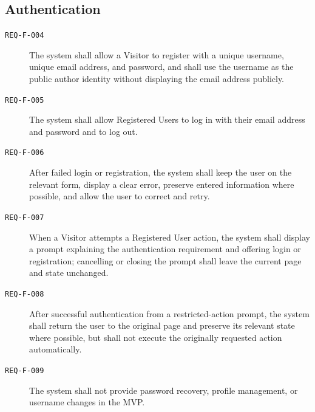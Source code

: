 \documentclass[12pt]{article}
\begin{document}
\subsection{Authentication}
\begin{description}
    \item[\texttt{REQ-F-004}] The system shall allow a Visitor to register with a unique username, unique email address, and password, and shall use the username as the public author identity without displaying the email address publicly.
    \item[\texttt{REQ-F-005}] The system shall allow Registered Users to log in with their email address and password and to log out.
    \item[\texttt{REQ-F-006}] After failed login or registration, the system shall keep the user on the relevant form, display a clear error, preserve entered information where possible, and allow the user to correct and retry.
    \item[\texttt{REQ-F-007}] When a Visitor attempts a Registered User action, the system shall display a prompt explaining the authentication requirement and offering login or registration; cancelling or closing the prompt shall leave the current page and state unchanged.
    \item[\texttt{REQ-F-008}] After successful authentication from a restricted-action prompt, the system shall return the user to the original page and preserve its relevant state where possible, but shall not execute the originally requested action automatically.
    \item[\texttt{REQ-F-009}] The system shall not provide password recovery, profile management, or username changes in the MVP.
\end{description}
\end{document}
